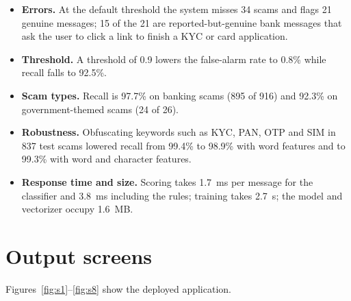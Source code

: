\documentclass[12pt,a4paper]{report}
\begin{document}
\begin{itemize}
\item \textbf{Errors.} At the default threshold the system misses 34 scams and flags 21 genuine messages; 15 of the 21 are reported-but-genuine bank messages that ask the user to click a link to finish a KYC or card application.
\item \textbf{Threshold.} A threshold of 0.9 lowers the false-alarm rate to 0.8\% while recall falls to 92.5\%.
\item \textbf{Scam types.} Recall is 97.7\% on banking scams (895 of 916) and 92.3\% on government-themed scams (24 of 26).
\item \textbf{Robustness.} Obfuscating keywords such as KYC, PAN, OTP and SIM in 837 test scams lowered recall from 99.4\% to 98.9\% with word features and to 99.3\% with word and character features.
\item \textbf{Response time and size.} Scoring takes 1.7~ms per message for the classifier and 3.8~ms including the rules; training takes 2.7~s; the model and vectorizer occupy 1.6~MB.
\end{itemize}

\section{Output screens}
Figures~\ref{fig:s1}--\ref{fig:s8} show the deployed application.
\end{document}
